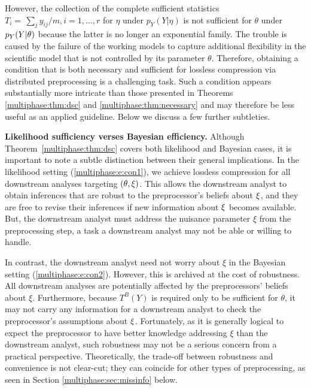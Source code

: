 However,  the collection of the complete sufficient statistics $T_i =  \, \sum_j y_{ij}/m, i=1, \ldots, r$ for  $\eta$ under $p_Y(Y|\eta)$ is not sufficient for $\theta$ under $p_Y(Y | \theta)$ because the latter is no longer an exponential family.
The trouble is caused by the failure of the working models to capture additional flexibility in the scientific model that is not controlled by  its parameter $\theta$.
 Therefore, obtaining a condition that is both necessary and sufficient for lossless compression via distributed preprocessing is a challenging task.
Such a condition appears substantially more intricate than those presented in Theorems \ref{multiphase:thm:dsc} and \ref{multiphase:thm:necessary} and may therefore be less useful as an applied guideline.
Below we discuss a few further subtleties.
  
\medskip
\noindent
{\bf Likelihood sufficiency verses Bayesian efficiency.}
Although Theorem~\ref{multiphase:thm:dsc} covers both likelihood and Bayesian cases, it is important to note a subtle distinction between their general implications.
 In the likelihood setting (\ref{multiphase:e:con1}), we achieve lossless compression for all downstream analyses targeting $(\theta, \xi)$.
 This allows the downstream analyst to obtain inferences that are robust to the preprocessor's beliefs about $\xi$, and they are free to revise their inferences if new information about $\xi$ becomes available.
But, the downstream analyst must address the nuisance parameter $\xi$ from the preprocessing step, a task a downstream analyst may not be able or willing to handle.

In contrast, the downstream analyst need not worry about $\xi$ in the Bayesian setting (\ref{multiphase:e:con2}).
However, this is archived at the cost of robustness.
All downstream analyses are potentially affected by the preprocessors' beliefs about $\xi$.
Furthermore, because $T^B(Y)$ is required only to be sufficient for $\theta$,  it may not carry any information for a downstream analyst to check the preprocessor's assumptions about $\xi$.
Fortunately, as it is generally logical to expect the preprocessor to have better knowledge addressing $\xi$ than the downstream analyst, such robustness may not be a serious concern from a practical perspective.
Theoretically, the trade-off between robustness and convenience is not  clear-cut; they can coincide for other types of preprocessing, as seen in Section \ref{multiphase:sec:missinfo} below.

